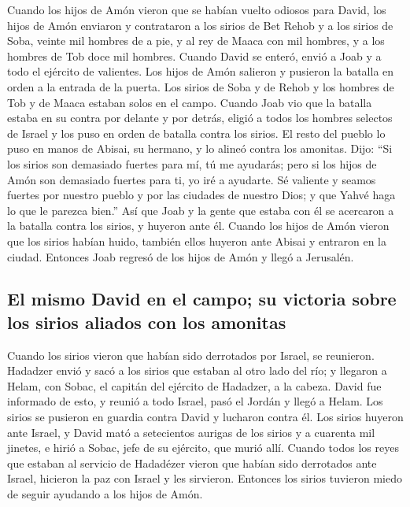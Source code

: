  Cuando los hijos de Amón vieron que se habían vuelto
odiosos para David, los hijos de Amón enviaron y contrataron a los
sirios de Bet Rehob y a los sirios de Soba, veinte mil hombres de a pie,
y al rey de Maaca con mil hombres, y a los hombres de Tob doce mil
hombres.  Cuando David se enteró, envió a Joab y a todo el
ejército de valientes.  Los hijos de Amón salieron y
pusieron la batalla en orden a la entrada de la puerta. Los sirios de
Soba y de Rehob y los hombres de Tob y de Maaca estaban solos en el
campo.  Cuando Joab vio que la batalla estaba en su contra
por delante y por detrás, eligió a todos los hombres selectos de Israel
y los puso en orden de batalla contra los sirios.  El
resto del pueblo lo puso en manos de Abisai, su hermano, y lo alineó
contra los amonitas.  Dijo: ``Si los sirios son demasiado
fuertes para mí, tú me ayudarás; pero si los hijos de Amón son demasiado
fuertes para ti, yo iré a ayudarte.  Sé valiente y seamos
fuertes por nuestro pueblo y por las ciudades de nuestro Dios; y que
Yahvé haga lo que le parezca bien.''  Así que Joab y la
gente que estaba con él se acercaron a la batalla contra los sirios, y
huyeron ante él.  Cuando los hijos de Amón vieron que los
sirios habían huido, también ellos huyeron ante Abisai y entraron en la
ciudad. Entonces Joab regresó de los hijos de Amón y llegó a Jerusalén.

\hypertarget{el-mismo-david-en-el-campo-su-victoria-sobre-los-sirios-aliados-con-los-amonitas}{%
\subsection{El mismo David en el campo; su victoria sobre los sirios
aliados con los
amonitas}\label{el-mismo-david-en-el-campo-su-victoria-sobre-los-sirios-aliados-con-los-amonitas}}

 Cuando los sirios vieron que habían sido derrotados por
Israel, se reunieron.  Hadadzer envió y sacó a los sirios
que estaban al otro lado del río; y llegaron a Helam, con Sobac, el
capitán del ejército de Hadadzer, a la cabeza.  David fue
informado de esto, y reunió a todo Israel, pasó el Jordán y llegó a
Helam. Los sirios se pusieron en guardia contra David y lucharon contra
él.  Los sirios huyeron ante Israel, y David mató a
setecientos aurigas de los sirios y a cuarenta mil jinetes, e hirió a
Sobac, jefe de su ejército, que murió allí.  Cuando todos
los reyes que estaban al servicio de Hadadézer vieron que habían sido
derrotados ante Israel, hicieron la paz con Israel y les sirvieron.
Entonces los sirios tuvieron miedo de seguir ayudando a los hijos de
Amón.

